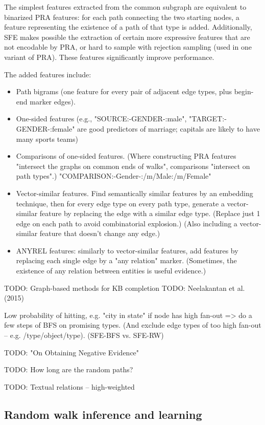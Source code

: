 The simplest features extracted from the common subgraph are equivalent to
binarized PRA features: for each path connecting the two starting nodes, a
feature representing the existence of a path of that type is added.
Additionally, SFE makes possible the extraction of certain more expressive
features that are not encodable by PRA, or hard to sample with rejection
sampling (used in one variant of PRA). These features significantly improve
performance.

The added features include:
\begin{itemize}
\item Path bigrams (one feature for every pair of adjacent
edge types, plus begin-end marker edges).
\item One-sided features (e.g., "SOURCE:-GENDER-:male", "TARGET:-GENDER-:female"
are good predictors of marriage; capitals are likely to have many sports teams)
\item Comparisons of one-sided features. (Where constructing PRA features
"intersect the graphs on common ends of walks", comparisons "intersect on
path types".) "COMPARISON:-Gender-:/m/Male:/m/Female"
\item Vector-similar features. Find semantically similar features by an
embedding technique, then for every edge type on every path type, generate
a vector-similar feature by replacing the edge with a similar edge type.
(Replace just 1 edge on each path to avoid combinatorial explosion.)
(Also including a vector-similar feature that doesn't change any edge.)
\item ANYREL features: similarly to vector-similar features, add features
by replacing each single edge by a "any relation" marker. (Sometimes, the
existence of any relation between entities is useful evidence.)
\end{itemize}

TODO: Graph-based methods for KB completion
TODO: Neelakantan et al. (2015)

Low probability of hitting, e.g. "city in state" if node has high fan-out =>
do a few steps of BFS on promising types. (And exclude edge types of too high
fan-out -- e.g. /type/object/type). (SFE-BFS vs. SFE-RW)

TODO: "On Obtaining Negative Evidence"

TODO: How long are the random paths?

TODO: Textual relations -- high-weighted

\subsection{Random walk inference and learning}

